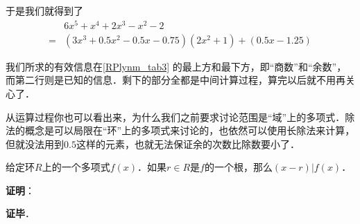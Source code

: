 于是我们就得到了
\begin{equation}
\begin{aligned}
&6x^5+x^4+2x^3-x^2-2 \\
= &(3x^3+0.5x^2-0.5x-0.75)(2x^2+1)+(0.5x-1.25)
\end{aligned}
\end{equation}

我们所求的有效信息在\autoref{RPlynm_tab3} 的最上方和最下方，即“商数”和“余数”，而第二行则是已知的信息．剩下的部分全都是中间计算过程，算完以后就不用再关心了．

从运算过程你也可以看出来，为什么我们之前要求讨论范围是“域”上的多项式．除法的概念是可以局限在“环”上的多项式来讨论的，也依然可以使用长除法来计算，但就没法用到$0.5$这样的元素，也就无法保证余的次数比除数要小了．


\begin{theorem}{}
给定环$R$上的一个多项式$f(x)$．如果$r\in R$是$f$的一个根，那么$(x-r)|f(x)$．
\end{theorem}

\textbf{证明}：



\textbf{证毕}．
















